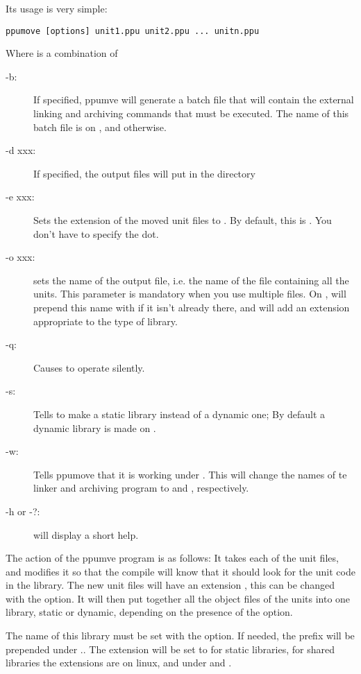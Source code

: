 Its usage is very simple:
\begin{verbatim}
ppumove [options] unit1.ppu unit2.ppu ... unitn.ppu
\end{verbatim}
Where  is a combination of
\begin{description}
\item[-b:\ ] If specified, ppumve will generate a batch file that will
contain the external linking and archiving commands that must be
executed. The name of this batch file is  on \linux, and
 otherwise.
\item[-d xxx:\ ] If specified, the output files will put in the directory
\item[-e xxx:\ ] Sets the extension of the moved unit files to .
By default, this is . You don't have to specify the dot.
\item[-o xxx:\ ] sets the name of the output file, i.e. the name of the file
containing all the units. This parameter is mandatory when you use multiple
files. On \linux,  will prepend this name with  if it isn't
already there, and will add an extension appropriate to the type of library.
\item [-q:\ ] Causes  to operate silently.
\item [-s:\ ] Tells  to make a static library instead of a
dynamic one; By default a dynamic library is made on \linux.
\item [-w:\ ] Tells ppumove that it is working under \windowsnt. This will
change the names of te linker and archiving program to  and
, respectively.
\item[-h or -?:\ ] will display a short help.
\end{description}

The action of the ppumve program is as follows:
It takes each of the unit files, and modifies it so that the compile will
know that it should look for the unit code in the library. The new unit
files will have an extension , this can be changed with the
 option. It will then put together all the object files of the units
into one library, static or dynamic, depending on the presence of the
 option.

The name of this library must be set with the  option.
If needed, the prefix  will be prepended under \linux..
The extension will be set to  for static libraries,
for shared libraries the extensions are  on linux, and 
under \windowsnt and \ostwo.

